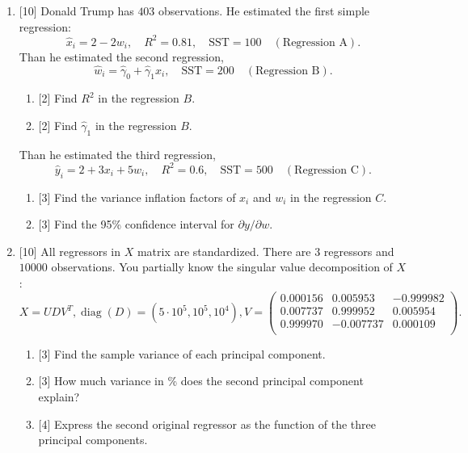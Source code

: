 \documentclass[12pt]{article}
\DeclareMathOperator{\diag}{diag}
\newcommand{\SST}{\text{SST}}
\begin{document}
\begin{enumerate}
    \item {[10]} Donald Trump has $403$ observations. 
    He estimated the first simple regression:
    \[
    \hat x_i = 2 - 2 w_i, \quad R^2 = 0.81, \quad \SST = 100 \quad (\text{Regression A}).
    \]
    Than he estimated the second regression,
    \[
    \hat w_i = \hat \gamma_0 + \hat\gamma_1 x_i, \quad \SST = 200 \quad (\text{Regression B}).
    \]
    \begin{enumerate}
        \item {[2]} Find $R^2$ in the regression $B$.
        \item {[2]} Find $\hat\gamma_1$ in the regression $B$.
    \end{enumerate}
    Than he estimated the third regression, 
    \[
    \hat y_i = 2 + 3x_i + 5w_i, \quad R^2 = 0.6, \quad \SST = 500 \quad (\text{Regression C}).
    \]
    \begin{enumerate}[resume]
        \item {[3]} Find the variance inflation factors of $x_i$ and $w_i$ in the regression $C$.
        \item {[3]} Find the 95\% confidence interval for $\partial y/\partial w$.
    \end{enumerate}
    \newpage 


    \item  {[10]} All regressors in $X$ matrix are standardized. 
    There are $3$ regressors and $10000$ observations. 
    You partially know the singular value decomposition of $X$:
    \[
    X = UDV^T, \diag(D) = (5 \cdot 10^5, 10^5, 10^4),
    V = \begin{pmatrix}
        0.000156 & 0.005953 & -0.999982 \\ 
        0.007737 & 0.999952 & 0.005954 \\ 
        0.999970 & -0.007737 & 0.000109 \\ 
        \end{pmatrix}.
    \]
    \begin{enumerate}
        \item {[3]} Find the sample variance of each principal component.
        \item {[3]} How much variance in \% does the second principal component explain?
        \item {[4]} Express the second original regressor as the function of the three principal components.
    \end{enumerate}


    

\end{enumerate}
\end{document}
